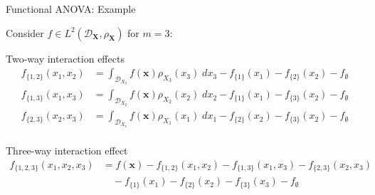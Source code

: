 \documentclass[english,aspectratio=169]{beamer}
\let\tempone\itemize
\let\temptwo\enditemize
\renewenvironment{itemize}{\tempone\addtolength{\itemsep}{0.35\baselineskip}}{\temptwo}
\renewcommand{\emph}[1]{\textcolor[HTML]{006d2c}{\fontseries{sb}\selectfont #1}}
\begin{document}
\begin{frame}[fragile]{Functional ANOVA: Example}
\small

\vspace{-1em}

Consider $f \in L^2(\mathcal{D}_{\boldsymbol{X}}, \rho_{\boldsymbol{X}})$ for $m = 3$:
\vspace{1.0em}
\begin{itemize}  
  \item \emph{Two-way interaction effects}
  \begin{align*}
    f_{\{ 1, 2 \}} (x_1, x_2) & = \int_{\mathcal{D}_{X_3}} f (\bm{x}) \rho_{X_3} (x_3) \; dx_3 - f_{\{ 1 \}} (x_1) - f_{\{ 2 \}} (x_2) - f_\emptyset \\
    f_{\{ 1, 3 \}} (x_1, x_3) & = \int_{\mathcal{D}_{X_2}} f (\bm{x}) \rho_{X_2} (x_2) \; dx_2 - f_{\{ 1 \}} (x_1) - f_{\{ 3 \}} (x_2) - f_\emptyset \\
    f_{\{ 2, 3 \}} (x_2, x_3) & = \int_{\mathcal{D}_{X_1}} f (\bm{x}) \rho_{X_1} (x_1) \; dx_1 - f_{\{ 2 \}} (x_2) - f_{\{ 3 \}} (x_2) - f_\emptyset \\
  \end{align*}

  \item \emph{Three-way interaction effect}
  \begin{align*}
    f_{\{ 1, 2, 3 \}} (x_1, x_2, x_3)  & = f(\bm{x}) - f_{\{ 1, 2 \}} (x_1, x_2) - f_{\{ 1, 3 \}} (x_1, x_3) - f_{\{ 2, 3 \}} (x_2, x_3) \\
                                       &\quad - f_{\{ 1 \}} (x_1) - f_{\{ 2 \}} (x_2) - f_{\{ 3 \}} (x_3) - f_\emptyset
  \end{align*}

\end{itemize}

\end{frame}
\end{document}
